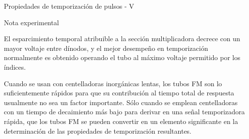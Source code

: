 \documentclass[a4paper,10pt]{beamer}
\begin{document}
\begin{frame}{Propiedades de temporización de pulsos - V}
\begin{exampleblock}{Nota experimental}
 \begin{justify}
 El esparcimiento temporal atribuible a la sección multiplicadora decrece con un 
 mayor voltaje entre dínodos, y el mejor desempeño en temporización normalmente es 
 obtenido operando el tubo al máximo voltaje permitido por los índices.
 
 \vspace{.3cm}
 
 Cuando se usan con centelladoras inorgánicas lentas, los tubos FM son lo suficientemente
 rápidos para que su contribución al tiempo total de respuesta usualmente no sea 
 un factor importante. Sólo cuando se emplean centelladoras con un tiempo de 
 decaimiento más bajo para derivar en una señal temporizadora rápida, que 
 los tubos FM se pueden convertir en un elemento significante en la determinación 
 de las propiedades de temporización resultantes.
 
 \end{justify}
\end{exampleblock}
 \end{frame}
 
\end{document}
